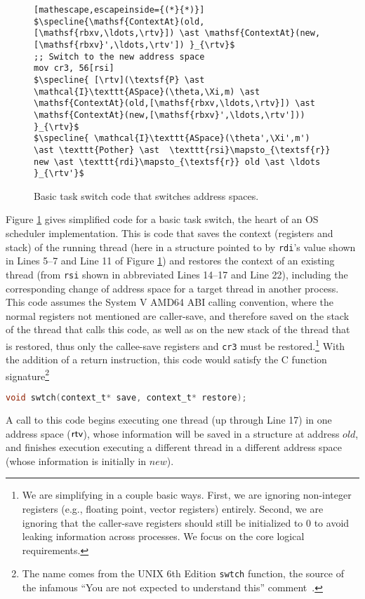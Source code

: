 \begin{figure}
\begin{lstlisting}[mathescape,escapeinside={(*}{*)}]
$\specline{\mathsf{ContextAt}(old,[\mathsf{rbxv,\ldots,\rtv}]) \ast \mathsf{ContextAt}(new,[\mathsf{rbxv}',\ldots,\rtv']) }_{\rtv}$
;; Switch to the new address space
mov cr3, 56[rsi]
$\specline{ [\rtv](\textsf{P} \ast \mathcal{I}\texttt{ASpace}(\theta,\Xi,m) \ast \mathsf{ContextAt}(old,[\mathsf{rbxv,\ldots,\rtv}]) \ast \mathsf{ContextAt}(new,[\mathsf{rbxv}',\ldots,\rtv']))  }_{\rtv}$
$\specline{ \mathcal{I}\texttt{ASpace}(\theta',\Xi',m') \ast \texttt{Pother} \ast  \texttt{rsi}\mapsto_{\textsf{r}} new \ast \texttt{rdi}\mapsto_{\textsf{r}} old \ast \ldots }_{\rtv'}$
\end{lstlisting}
\vspace{-1em}
\caption{Basic task switch code that switches address spaces.}
\label{fig:swtch}
\end{figure}

Figure \ref{fig:swtch} gives simplified code for a basic task switch, the heart of an OS scheduler implementation. This is code that saves the context (registers and stack)
of the running thread (here in a structure pointed to by \lstinline|rdi|'s value shown in Lines 5--7 and Line 11 of Figure \ref{fig:swtch}) and restores the context of 
an existing thread (from \lstinline|rsi| shown in abbreviated Lines 14--17 and Line 22), including the corresponding change of address space for a target thread in another process.
This code assumes the System V AMD64 ABI calling convention, where the normal registers not mentioned are caller-save, and therefore saved on the stack of the thread
that calls this code, as well as on the new stack of the thread that is restored, thus only the callee-save registers and \texttt{cr3} must be 
restored.\footnote{We are simplifying in a couple basic ways. First, we are ignoring non-integer registers (e.g., floating point, vector registers) entirely. Second, we are ignoring that the caller-save registers should still be initialized to 0 to avoid leaking information across processes. We focus on the core logical requirements.}
With the addition of a return instruction, this code would satisfy the C function signature\footnote{The name comes from the UNIX 6th Edition \lstinline|swtch| function, the source of the infamous ``You are not expected to understand this'' comment~\cite{lions1996lions}.}
\begin{lstlisting}[language=C]
void swtch(context_t* save, context_t* restore);
\end{lstlisting}
A call to this code begins executing one thread (up through Line 17) in one address space ($\textsf{rtv}$), whose information will be saved in a structure at address $old$,
and finishes execution executing a different thread in a different address space (whose information is initially in $new$).

